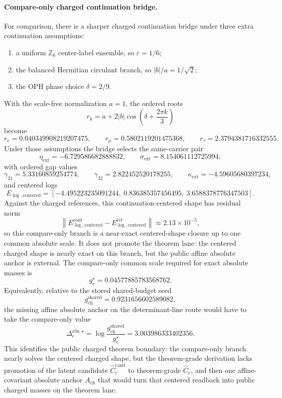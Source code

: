 \documentclass[11pt]{article}
\begin{document}
\paragraph{Compare-only charged continuation bridge.}
For comparison, there is a sharper charged continuation bridge under three extra continuation
assumptions:
\begin{enumerate}[leftmargin=2em]
\item a uniform \(\mathbb Z_6\) center-label ensemble, so \(\varepsilon = 1/6\);
\item the balanced Hermitian circulant branch, so \(|b|/a = 1/\sqrt2\);
\item the OPH phase choice \(\delta = 2/9\).
\end{enumerate}
With the scale-free normalization \(a=1\), the ordered roots
\[
r_k = a + 2|b|\cos\!\left(\delta + \frac{2\pi k}{3}\right)
\]
become
\[
r_e = 0.040349908219207475,
\qquad
r_\mu = 0.5802119201475368,
\qquad
r_\tau = 2.3794381716332555.
\]
Under those assumptions the bridge selects the same-carrier pair
\[
\eta_{\mathrm{ext}} = -6.729586682888832,
\qquad
\sigma_{\mathrm{ext}} = 8.154061112725994,
\]
with ordered gap values
\[
\gamma_{21}=5.33160859254774,
\qquad
\gamma_{32}=2.822452520178255,
\qquad
\kappa_{\mathrm{ext}}=-4.59605680397234,
\]
and centered logs
\[
E_{\log,\mathrm{centered}}
=
[-4.495223235091244,\ 0.836385357456495,\ 3.6588378776347503].
\]
Against the charged references, this continuation-centered shape has residual norm
\[
\left\|E_{\log,\mathrm{centered}}^{\mathrm{cont}}
-E_{\log,\mathrm{centered}}^{\mathrm{ref}}\right\|
\approx
2.13\times10^{-5},
\]
so this compare-only branch is a near-exact centered-shape closure up to one common absolute
scale. It does not promote the theorem lane: the centered charged shape is nearly exact on this
branch, but the public affine absolute anchor is external. The compare-only common scale
required for exact absolute masses is
\[
g_e^\star = 0.04577885783568762.
\]
Equivalently, relative to the stored shared-budget seed
\[
g_{\mathrm{ch}}^{\mathrm{shared}} = 0.9231656602589082,
\]
the missing affine absolute anchor on the determinant-line route would have to take the compare-only value
\[
\Delta_e^{\mathrm{abs},\star}
=
\log\!\frac{g_{\mathrm{ch}}^{\mathrm{shared}}}{g_e^\star}
=
3.003986333402356.
\]
This identifies the public charged theorem boundary: the compare-only branch nearly solves
the centered charged shape, but the theorem-grade derivation lacks promotion of the latent
candidate \(\widehat C_e^{\mathrm{cand}}\) to theorem-grade \(\widehat C_e\), and then one
affine-covariant absolute anchor \(A_{\mathrm{ch}}\) that would turn that centered readback into
public charged masses on the theorem lane.
\end{document}
